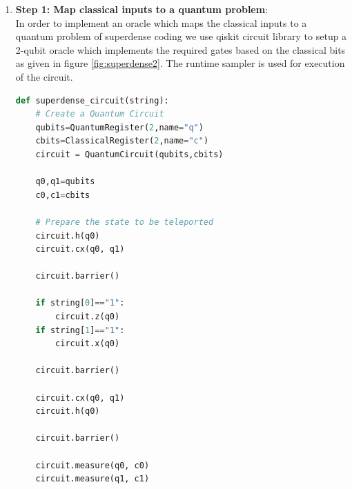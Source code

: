 \begin{enumerate}
    \item \textbf{Step 1: Map classical inputs to a quantum problem}: \\
   In order to implement an oracle which maps the classical inputs to a quantum problem of superdense coding we use qiskit circuit library to setup a 2-qubit oracle which implements the required gates based on the classical bits as given in figure \ref{fig:superdense2}. The runtime sampler is used for execution of the circuit.
   
\begin{lstlisting}[language=Python]
def superdense_circuit(string):
    # Create a Quantum Circuit
    qubits=QuantumRegister(2,name="q")
    cbits=ClassicalRegister(2,name="c")
    circuit = QuantumCircuit(qubits,cbits)
    
    q0,q1=qubits
    c0,c1=cbits

    # Prepare the state to be teleported
    circuit.h(q0)
    circuit.cx(q0, q1)

    circuit.barrier()

    if string[0]=="1":
        circuit.z(q0)
    if string[1]=="1":
        circuit.x(q0)

    circuit.barrier()
    
    circuit.cx(q0, q1)
    circuit.h(q0)

    circuit.barrier()
    
    circuit.measure(q0, c0)
    circuit.measure(q1, c1)


\end{lstlisting}
\end{enumerate}
